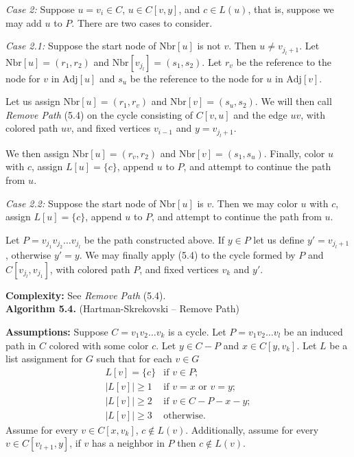 \documentclass[letterpaper, 12pt]{article}
\theoremstyle{definition}
\theoremstyle{definition}
\theoremstyle{thm}
\theoremstyle{definition}
\begin{document}
\textit{Case 2:} Suppose $u=v_i\in C$,
$u\in C[v,y]$, and $c\in L(u)$, that is, suppose we may add $u$ to $P$.
There are two cases to consider.

\textit{Case 2.1:} Suppose the start node of $\text{Nbr}[u]$ is not $v$. Then
$u\ne v_{j_l +1}$. Let $\text{Nbr}[u]=(r_1,r_2)$ and
$\text{Nbr}[v_{j_l}]=(s_1,s_2)$. Let $r_v$ be the reference to the node for
$v$ in $\text{Adj}[u]$ and $s_u$ be the reference to the node for $u$ in
$\text{Adj}[v]$.

Let us assign $\text{Nbr}[u]=(r_1,r_v)$ and $\text{Nbr}[v]=(s_u,s_2)$. We will
then call \textit{Remove Path} (5.4) on the cycle consisting of $C[v,u]$ and the
edge $uv$, with colored path $uv$, and fixed vertices $v_{i-1}$ and
$y=v_{j_l+1}$.

We then assign $\text{Nbr}[u]=(r_v,r_2)$ and $\text{Nbr}[v]=(s_1,s_u)$. Finally,
color $u$ with $c$, assign $L[u]=\{c\}$, append $u$ to $P$, and attempt to
continue the path from $u$.

\textit{Case 2.2:} Suppose the start node of $\text{Nbr}[u]$ is $v$. Then we may
color $u$ with $c$, assign $L[u]=\{c\}$, append $u$ to $P$, and attempt to
continue the path from $u$.

Let $P=v_{j_1}v_{j_2}\ldots v_{j_l}$ be the path constructed above.
If $y\in P$ let us define $y'=v_{j_l+1}$, otherwise $y'=y$.
We may finally apply  (5.4) to the cycle formed by $P$ and
$C[v_{j_l},v_{j_1}]$, with colored path $P$, and fixed
vertices $v_k$ and $y'$.

\noindent\textbf{Complexity:} See \textit{Remove Path} (5.4).\\

\noindent\textbf{Algorithm 5.4.} (Hartman-Skrekovski -- Remove Path)

\noindent\textbf{Assumptions:} Suppose $C=v_1v_2\ldots v_k$ is a cycle. Let
$P=v_1v_2\ldots v_l$ be an induced path in $C$ colored with some color $c$. Let
$y\in C-P$ and $x\in C[y,v_k]$. Let $L$ be a list assignment for $G$ such that
for each $v\in G$
\[
    \begin{array}{ll}
        L[v]=\{c\} & \text{if } v\in P;\\
	    |L[v]|\ge 1 & \text{if } v=x \text{ or } v=y;\\
	    |L[v]|\ge 2 & \text{if } v\in C-P-x-y;\\
	    |L[v]|\ge 3 & \text{otherwise.}
    \end{array}
\]
Assume for every $v\in C[x,v_k]$, $c\not\in L(v)$. Additionally, assume for
every $v\in C[v_{l+1},y]$, if $v$ has a neighbor in $P$ then $c\not\in L(v)$.
\end{document}
